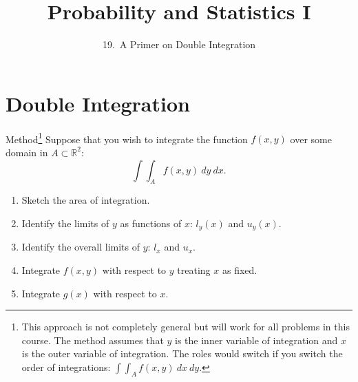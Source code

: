 

\newcommand{\lecturenum}{19}

\title[SS2857]{Probability and Statistics I}
\subtitle{\lecturenum.~A Primer on Double Integration}

\date{}






{

\begin{frame}
  \addtocounter{framenumber}{-1}

  \maketitle
\end{frame}
}


\section{Double Integration}

\begin{frame}

  \begin{block}{Method\footnote{This approach is not completely general but will work for all problems in this course. The method assumes that $y$ is the inner variable of integration and $x$ is the outer variable of integration. The roles would switch if you switch the order of integrations: $\int \int_A f(x,y) ~dx ~dy$.}}
    Suppose that you wish to integrate the function $f(x,y)$ over some domain in $A \subset \mathbb R^2$:
    $$
    \int \int_A f(x,y) ~dy ~dx.
    $$
    \begin{scriptsize}
    \begin{enumerate}[1)]
    \item Sketch the area of integration.
    \item Identify the limits of $y$ as functions of $x$: $l_y(x)$ and $u_y(x)$.
    \item Identify the overall limits of $y$: $l_x$ and $u_x$.
    \item Integrate $f(x,y)$ with respect to $y$ treating $x$ as fixed.
    \item Integrate $g(x)$ with respect to $x$. 
    \end{enumerate}
    \end{scriptsize}
    
  \end{block}
\end{frame}




